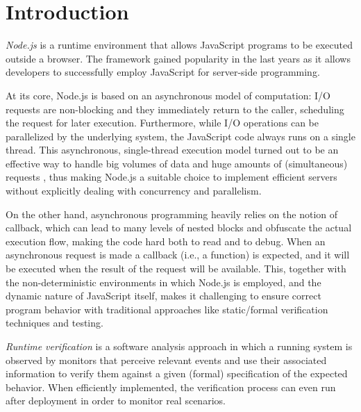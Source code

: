 \section{Introduction}
\emph{Node.js} is a runtime environment that allows JavaScript programs to be executed outside a browser.
The framework gained popularity in the last years as it allows developers to successfully employ JavaScript for server-side programming.

At its core, Node.js is based on an asynchronous model of computation: I/O requests are non-blocking and they immediately return to the caller, scheduling the request for later execution.
Furthermore, while I/O operations can be parallelized by the underlying system, the JavaScript code always runs on a single thread.
This asynchronous, single-thread execution model turned out to be an effective way to handle big volumes of data and huge amounts of (simultaneous) requests \cite{Nodejs10,NodejsPerformance14}, thus making Node.js a suitable choice to implement efficient servers without explicitly dealing with concurrency and parallelism.


%

On the other hand, asynchronous programming heavily relies on the notion of callback, which can lead to many levels of nested blocks and obfuscate the actual execution flow, making the code hard both to read and to debug.
When an asynchronous request is made a callback (i.e., a function) is expected, and it will be executed when the result of the request will be available.
This, together with the non-deterministic environments in which Node.js is employed, and the dynamic nature of JavaScript itself, makes it challenging to ensure correct program behavior with traditional approaches like static/formal verification techniques and testing.

\emph{Runtime verification} \cite{rv} is a software analysis approach in which a running system is observed by monitors that perceive relevant events and use their associated information to verify them against a given (formal) specification of the expected behavior.
When efficiently implemented, the verification process can even run after deployment in order to monitor real scenarios.

